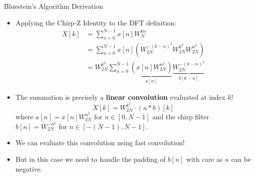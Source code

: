 \begin{frame}{Bluestein's Algorithm Derivation}
    \begin{itemize}
        \item Applying the Chirp-Z Identity to the DFT definition:
              \begin{align*}
                  X[k] & = \sum_{n=0}^{N-1} x[n] W_N^{kn}                                                                                           \\
                       & = \sum_{n=0}^{N-1} x[n] \left(W_{2N}^{-(k-n)^2} W_{2N}^{k^2} W_{2N}^{n^2}\right)                                           \\
                       & = W_{2N}^{k^2} \sum_{n=0}^{N-1} \underbrace{\left(x[n] W_{2N}^{n^2}\right)}_{a[n]} \underbrace{W_{2N}^{-(k-n)^2}}_{b[k-n]}
              \end{align*}
        \item The summation is precisely a \textbf{linear convolution} evaluated at index $k$!
              \begin{equation*}
                  X[k] = W_{2N}^{k^2} \cdot (a * b)[k]
              \end{equation*}
              where $a[n] = x[n] W_{2N}^{n^2}$ for $n \in [0, N-1]$ and the chirp filter $b[n] = W_{2N}^{-n^2}$ for $n \in [-(N-1), N-1]$.
        \item We can evaluate this convolution using fast convolution!
        \item But in this case we need to handle the padding of $b[n]$ with care as $n$ can be negative.
    \end{itemize}
\end{frame}


